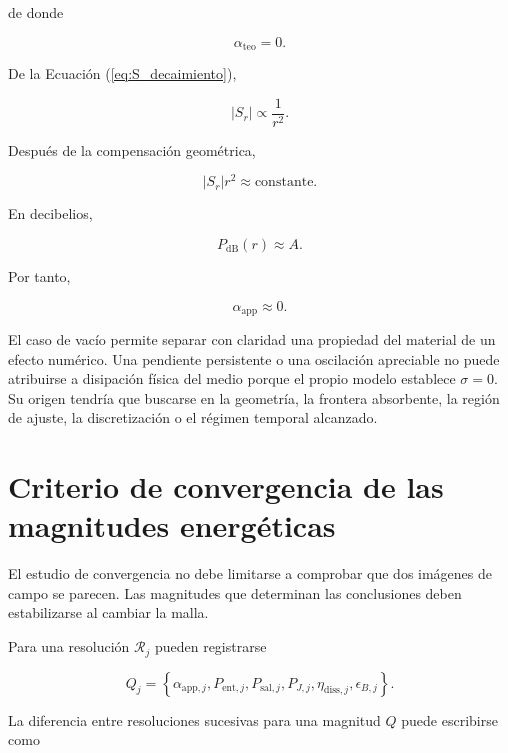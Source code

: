 de donde

\begin{equation}
\alpha_{\mathrm{teo}}=0.
\end{equation}

De la Ecuación (\ref{eq:S_decaimiento}),

\begin{equation}
|S_r|
\propto
\frac{1}{r^2}.
\end{equation}

Después de la compensación geométrica,

\begin{equation}
|S_r|r^2
\approx
\mathrm{constante}.
\end{equation}

En decibelios,

\begin{equation}
P_{\mathrm{dB}}(r)
\approx
A.
\end{equation}

Por tanto,

\begin{equation}
\alpha_{\mathrm{app}}
\approx0.
\end{equation}

El caso de vacío permite separar con claridad una propiedad del material de un efecto numérico. Una pendiente persistente o una oscilación apreciable no puede atribuirse a disipación física del medio porque el propio modelo establece $\sigma=0$. Su origen tendría que buscarse en la geometría, la frontera absorbente, la región de ajuste, la discretización o el régimen temporal alcanzado.

\section{Criterio de convergencia de las magnitudes energéticas}

El estudio de convergencia no debe limitarse a comprobar que dos imágenes de campo se parecen. Las magnitudes que determinan las conclusiones deben estabilizarse al cambiar la malla.

Para una resolución $\mathcal{R}_j$ pueden registrarse

\begin{equation}
Q_j
=
\left\{
\alpha_{\mathrm{app},j},
P_{\mathrm{ent},j},
P_{\mathrm{sal},j},
P_{J,j},
\eta_{\mathrm{diss},j},
\epsilon_{B,j}
\right\}.
\end{equation}

La diferencia entre resoluciones sucesivas para una magnitud $Q$ puede escribirse como

